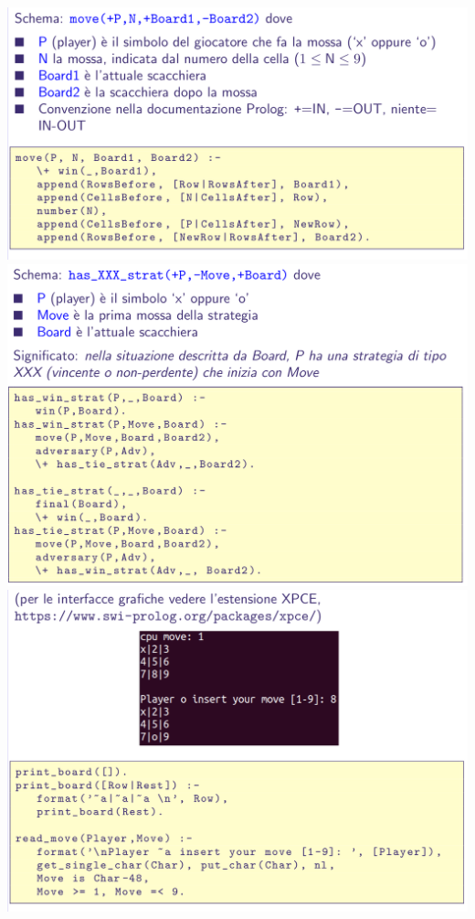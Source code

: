 \documentclass[10pt]{article}
\begin{document}
\\
\includegraphics[scale=0.25]{Immagini/pl46.png}
\\
\includegraphics[scale=0.25]{Immagini/pl47.png}
\\
\includegraphics[scale=0.25]{Immagini/pl48.png}
\end{document}
